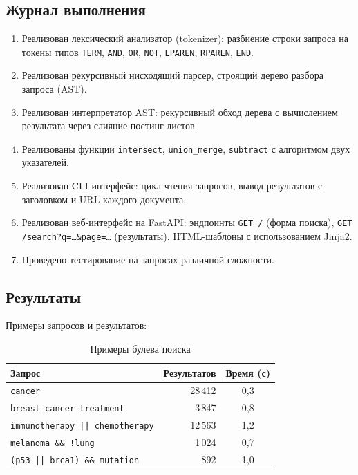 \documentclass[a4paper,12pt]{article}
\begin{document}
\subsection{Журнал выполнения}

\begin{enumerate}
    \item Реализован лексический анализатор (tokenizer): разбиение строки запроса на токены типов \texttt{TERM}, \texttt{AND}, \texttt{OR}, \texttt{NOT}, \texttt{LPAREN}, \texttt{RPAREN}, \texttt{END}.
    \item Реализован рекурсивный нисходящий парсер, строящий дерево разбора запроса (AST).
    \item Реализован интерпретатор AST: рекурсивный обход дерева с вычислением результата через слияние постинг-листов.
    \item Реализованы функции \texttt{intersect}, \texttt{union\_merge}, \texttt{subtract} с алгоритмом двух указателей.
    \item Реализован CLI-интерфейс: цикл чтения запросов, вывод результатов с заголовком и URL каждого документа.
    \item Реализован веб-интерфейс на FastAPI: эндпоинты \texttt{GET /} (форма поиска), \texttt{GET /search?q=\ldots\&page=\ldots} (результаты). HTML-шаблоны с использованием Jinja2.
    \item Проведено тестирование на запросах различной сложности.
\end{enumerate}

\subsection{Результаты}

Примеры запросов и результатов:

\begin{table}[H]
\centering
\caption{Примеры булева поиска}
\begin{tabular}{lrc}
\toprule
\textbf{Запрос} & \textbf{Результатов} & \textbf{Время (с)} \\
\midrule
\texttt{cancer}                          & 28\,412 & 0,3 \\
\texttt{breast cancer treatment}         & 3\,847  & 0,8 \\
\texttt{immunotherapy || chemotherapy}   & 12\,563 & 1,2 \\
\texttt{melanoma \&\& !lung}            & 1\,024  & 0,7 \\
\texttt{(p53 || brca1) \&\& mutation}   & 892     & 1,0 \\
\bottomrule
\end{tabular}
\end{table}
\end{document}
